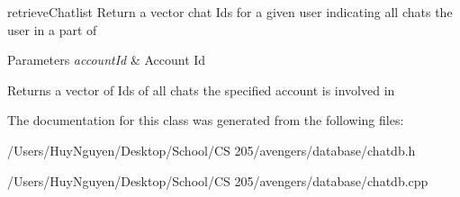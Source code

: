 retrieve\+Chatlist Return a vector chat Ids for a given user indicating all chats the user in a part of 


\begin{DoxyParams}{Parameters}
{\em account\+Id} & Account Id \\
\hline
\end{DoxyParams}
\begin{DoxyReturn}{Returns}
a vector of Ids of all chats the specified account is involved in 
\end{DoxyReturn}


The documentation for this class was generated from the following files\+:\begin{DoxyCompactItemize}
\item 
/\+Users/\+Huy\+Nguyen/\+Desktop/\+School/\+C\+S 205/avengers/database/chatdb.\+h\item 
/\+Users/\+Huy\+Nguyen/\+Desktop/\+School/\+C\+S 205/avengers/database/chatdb.\+cpp\end{DoxyCompactItemize}
